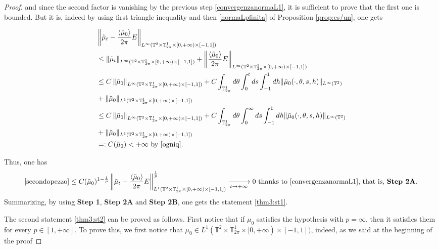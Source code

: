 \documentclass[a4paper,10pt,reqno]{amsart}
\numberwithin{equation}{subsection}
\numberwithin{figure}{subsection}
\begin{document}
\begin{proof}
and since the second factor is vanishing by the previous step \eqref{convergenzanormaL1}, it is sufficient to prove that the first one is bounded. But it is, indeed by using first triangle inequality and then \eqref{normaLpfinita} of Proposition \ref{prop:es/un}, one gets

\begin{align*}
&\left\|\tilde\mu_t-\frac{\langle\tilde\mu_0\rangle}{2\pi}E\right\|_{L^{\infty}(\mathbb{T}^2\times\mathbb{T}^1_{2\pi}\times[0,+\infty)\times[-1,1])}
\\
&\leq\left\|\tilde\mu_t\right\|_{L^{\infty}(\mathbb{T}^2\times\mathbb{T}^1_{2\pi}\times[0,+\infty)\times[-1,1])}+\left\|\frac{\langle\tilde\mu_0\rangle}{2\pi}E\right\|_{L^{\infty}(\mathbb{T}^2\times\mathbb{T}^1_{2\pi}\times[0,+\infty)\times[-1,1])}
\\
&\leq C\left\|\tilde\mu_0\right\|_{L^{\infty}(\mathbb{T}^2\times\mathbb{T}^1_{2\pi}\times[0,+\infty)\times[-1,1])}+C\int_{\mathbb{T}^1_{2\pi}}d\theta\int_0^tds\int_{-1}^1dh\|\tilde\mu_0(\cdot,\theta,s,h)\|_{L^{\infty}(\mathbb{T}^2)}
\\
&+\|\tilde\mu_0\|_{L^1(\mathbb{T}^2\times\mathbb{T}^1_{2\pi}\times[0,+\infty)\times[-1,1])}
\\
&\leq C\left\|\tilde\mu_0\right\|_{L^{\infty}(\mathbb{T}^2\times\mathbb{T}^1_{2\pi}\times[0,+\infty)\times[-1,1])}+C\int_{\mathbb{T}^1_{2\pi}}d\theta\int_0^{\infty}ds\int_{-1}^1dh\|\tilde\mu_0(\cdot,\theta,s,h)\|_{L^{\infty}(\mathbb{T}^2)}
\\
&+\|\tilde\mu_0\|_{L^1(\mathbb{T}^2\times\mathbb{T}^1_{2\pi}\times[0,+\infty)\times[-1,1])}
\\
&=:C(\tilde\mu_0)<+\infty\textrm{ by \eqref{ogniq}}.
\end{align*}

Thus, one has
{\tiny\[
\eqref{secondopezzo}\leq C(\tilde\mu_0)^{1-\frac{1}{p}}\left\|\tilde\mu_t-\frac{\langle\tilde\mu_0\rangle}{2\pi}E\right\|_{L^1(\mathbb{T}^2\times\mathbb{T}^1_{2\pi}\times[0,+\infty)\times[-1,1])}^{\frac{1}{p}}\xrightarrow[t\to+\infty]{}0\textrm{ thanks to \eqref{convergenzanormaL1}, that is, \textbf{Step 2A}}.
\]}
Summarizing, by using \textbf{Step 1}, \textbf{Step 2A} and \textbf{Step 2B}, one gets the statement \eqref{thm3:st1}.

The second statement \eqref{thm3:st2} can be proved as follows. First notice that if $\mu_0$ satisfies the hypothesis with $p=\infty$, then it satisfies them for every $p\in[1,+\infty]$. To prove this, we first notice that $\mu_0\in L^1(\mathbb{T}^2\times\mathbb{T}^1_{2\pi}\times[0,+\infty)\times[-1,1])$, indeed, as we said at the beginning of the proof


\end{proof}
\end{document}
